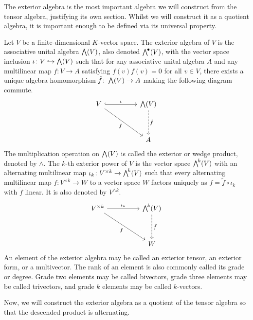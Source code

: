\documentclass[a4paper,12pt]{article}
\begin{document}
The exterior algebra is the most important algebra we will construct from the tensor algebra, justifying its own section.
Whilst we will construct it as a quotient algebra, it is important enough to be defined via its universal property.
\begin{definition}\label{def:exterior_algebra}
    Let $V$ be a finite-dimensional $K$-vector space.
    The exterior algebra of $V$ is the associative unital algebra $\extp(V)$, also denoted $\extp^\bullet(V)$, with the vector space inclusion $\iota \colon V \hookrightarrow \extp(V)$ such that for any associative unital algebra $A$ and any multilinear map $f \colon V \to A$ satisfying $f(v)f(v) = 0$ for all $v \in V$, there exists a unique algebra homomorphism $\tilde{f} \colon \extp(V) \to A$ making the following diagram commute.
    \[\begin{tikzcd}
            {V} && {\extp(V)} \\
            \\
            && {A}
            \arrow["\iota", hook, from=1-1, to=1-3]
            \arrow["f"', from=1-1, to=3-3]
            \arrow["\tilde{f}", dashed, from=1-3, to=3-3]
    \end{tikzcd}\]
    The multiplication operation on $\extp(V)$ is called the exterior or wedge product, denoted by $\wedge$.
    The $k$-th exterior power of $V$ is the vector space $\extp^k(V)$ with an alternating multilinear map $\iota_k \colon V^{\times k} \to \extp^k(V)$ such that every alternating multilinear map $f \colon V^{\times k} \to W$ to a vector space $W$ factors uniquely as $f = \tilde{f} \circ \iota_k$ with $\tilde{f}$ linear.
    It is also denoted by $V^{\wedge k}$.
    \[\begin{tikzcd}
            {V^{\times k}} && {\extp^k(V)} \\
            \\
            && {W}
            \arrow["\iota_k", from=1-1, to=1-3]
            \arrow["f"', from=1-1, to=3-3]
            \arrow["\tilde{f}", dashed, from=1-3, to=3-3]
    \end{tikzcd}\]
    An element of the exterior algebra may be called an exterior tensor, an exterior form, or a multivector.
    The rank of an element is also commonly called its grade or degree.
    Grade two elements may be called bivectors, grade three elements may be called trivectors, and grade $k$ elements may be called $k$-vectors.
\end{definition}
Now, we will construct the exterior algebra as a quotient of the tensor algebra so that the descended product is alternating.
\end{document}
